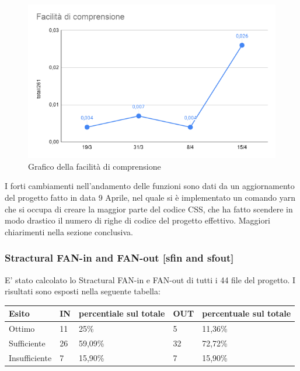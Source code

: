     \begin{figure}[H]
        \centering
        \includegraphics[width=10 cm]{source/sections/images/Facilita_comprensione.png}
        \caption{Grafico della facilità di comprensione}
    \end{figure}

    I forti cambiamenti nell'andamento delle funzioni sono dati da un aggiornamento del progetto fatto in data 9 Aprile, nel quale si è implementato un comando yarn che si occupa di creare la maggior parte del codice CSS, che ha fatto scendere in modo drastico il numero di righe di codice del progetto effettivo. Maggiori chiarimenti nella sezione conclusiva.

\subsubsection{Stractural FAN-in and FAN-out  [sfin and sfout]}
    E' stato calcolato lo Stractural FAN-in e FAN-out di tutti i 44 file del progetto. I risultati sono esposti nella seguente tabella:

    \begin{longtabu} to \textwidth {| X[0.1,c m] | X[0.1,c m] | X[0.1,c m] | X[0.1,c m] | X[0.1,c m] |}
        \hline
        \textbf{Esito} &
        \textbf{IN} &
        \textbf{percentiale sul totale} &
        \textbf{OUT} &
        \textbf{percentuale sul totale} \\
        \hline
        Ottimo & 11 & 25\% & 5 & 11,36\% \\ 
        \hline
        Sufficiente & 26 & 59,09\% & 32 & 72,72\% \\ 
        \hline
        Insufficiente & 7 & 15,90\% & 7 & 15,90\% \\ 
        \hline

        \end{longtabu}


